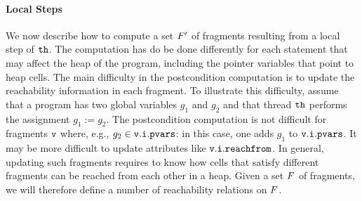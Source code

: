 \paragraph{Local Steps}
We now describe how to compute a set $F'$ of fragments resulting
from a local step of ${\tt th}$. The computation has do be done differently for
each statement that may affect the heap of the program, including the
pointer variables that point to heap cells. The main difficulty in the
postcondition computation is to update the reachability information in each
fragment. To illustrate this difficulty, assume that a program has
two global variables $g_1$ and $g_2$ and that thread ${\tt th}$ performs
the assignment $g_1 := g_2$. The postcondition computation is not difficult
for fragments $\mathtt{v}$ where, e.g., $g_2 \in \mathtt{v}.\mathtt{i}.\mathtt{pvars}$: in this
case, one adds $g_1$ to $\mathtt{v}.\mathtt{i}.\mathtt{pvars}$. It may be more difficult
to update attributes like $\mathtt{v}.\mathtt{i}.\mathtt{reachfrom}$.
In general, updating
such fragments requires to know how cells that satisfy different fragments
can be reached from each other in a heap. Given a set $F$ of
fragments, we will therefore define a number of reachability relations on
$F$.

